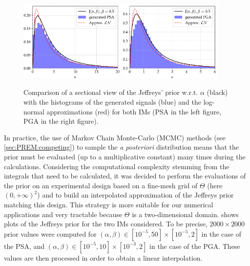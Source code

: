     \begin{figure}[h]
        \centering
        \includegraphics[width=5.2cm]{figures/PREM/PSAjeff.pdf}
        \hspace*{0.5cm}
        \includegraphics[width=5.2cm]{figures/PREM/PGAjeff.pdf}
        \caption{%
        Comparison of a sectional view of the Jeffreys' prior w.r.t. $\alpha$ (black) with the histograms of the generated signals (blue) and the log-normal approximations (red) for both IMs (PSA in the left figure, PGA in the right figure).
        }
        \label{fig:IM}
    \end{figure}

    In practice, the use of Markov Chain Monte-Carlo (MCMC) methods (see \cref{sec:PREM:competing}) to sample the \emph{a posteriori} distribution means that the prior must be evaluated (up to a multiplicative constant) many times during the calculations. Considering the computational complexity stemming from the integrals that need to be calculated, it was decided to perform the evaluations of the prior on an experimental design based on a fine-mesh grid of $\Theta$ (here $(0,+\infty)^2$) and to build an interpolated approximation of the Jeffreys prior matching this design. This strategy is more suitable for our numerical applications and very tractable because $\Theta$ is a two-dimensional domain.  shows plots of the Jeffreys prior for the two IMs considered. To be precise, $2000\times2000$ prior values were computed for 
    $(\alpha,\beta)\in[10^{-5},50]\times[10^{-5},2]$ in the case of the PSA, and
    $(\alpha,\beta)\in[10^{-5},10]\times[10^{-3},2]$ in the case of the PGA. %
    These values are then processed in order to obtain a linear interpolation. 
 
